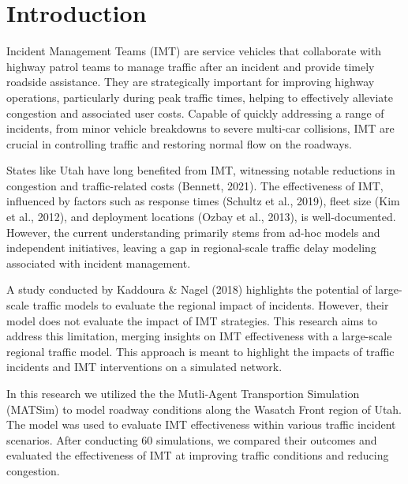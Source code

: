 \documentclass[fancy, oneside, mastersfancy, ms]{byuthesis}
\begin{document}
	\tableofcontents*
	\cleardoublepage

	\listoffigures
	\cleardoublepage

	\listoftables
	\cleardoublepage

\mainmatter
{}

\hypertarget{introduction}{%
\chapter{Introduction}\label{introduction}}

Incident Management Teams (IMT) are service vehicles that collaborate
with highway patrol teams to manage traffic after an incident and
provide timely roadside assistance. They are strategically important for
improving highway operations, particularly during peak traffic times,
helping to effectively alleviate congestion and associated user costs.
Capable of quickly addressing a range of incidents, from minor vehicle
breakdowns to severe multi-car collisions, IMT are crucial in
controlling traffic and restoring normal flow on the roadways.

States like Utah have long benefited from IMT, witnessing notable
reductions in congestion and traffic-related costs (Bennett, 2021). The
effectiveness of IMT, influenced by factors such as response times
(Schultz et al., 2019), fleet size (Kim et al., 2012), and deployment
locations (Ozbay et al., 2013), is well-documented. However, the current
understanding primarily stems from ad-hoc models and independent
initiatives, leaving a gap in regional-scale traffic delay modeling
associated with incident management.

A study conducted by Kaddoura \& Nagel (2018) highlights the potential
of large-scale traffic models to evaluate the regional impact of
incidents. However, their model does not evaluate the impact of IMT
strategies. This research aims to address this limitation, merging
insights on IMT effectiveness with a large-scale regional traffic model.
This approach is meant to highlight the impacts of traffic incidents and
IMT interventions on a simulated network.

In this research we utilized the the Mutli-Agent Transportion Simulation
(MATSim) to model roadway conditions along the Wasatch Front region of
Utah. The model was used to evaluate IMT effectiveness within various
traffic incident scenarios. After conducting 60 simulations, we compared
their outcomes and evaluated the effectiveness of IMT at improving
traffic conditions and reducing congestion.
\end{document}
